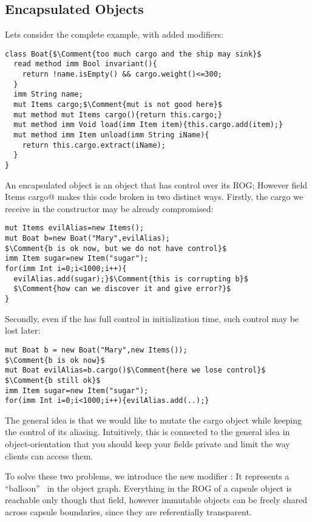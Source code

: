 \saveSpace
\subsection{Encapsulated Objects}
\label{s:encapsulated}
\saveSpace
Lets consider the
complete \Q@Boat@ example, with added modifiers:
\begin{lstlisting}
class Boat{$\Comment{too much cargo and the ship may sink}$
  read method imm Bool invariant(){
    return !name.isEmpty() && cargo.weight()<=300;
  }
  imm String name;
  mut Items cargo;$\Comment{mut is not good here}$
  mut method mut Items cargo(){return this.cargo;}
  mut method imm Void load(imm Item item){this.cargo.add(item);} 
  mut method imm Item unload(imm String iName){
    return this.cargo.extract(iName);
  }
}
\end{lstlisting}
An encapsulated object is an object
 that has control over its ROG;
However field \Q@mut Items cargo@ makes this code
broken in two distinct ways. Firstly, the cargo we receive in the constructor may
be already compromised:
\saveSpace
\begin{lstlisting}
mut Items evilAlias=new Items();
mut Boat b=new Boat("Mary",evilAlias);
$\Comment{b is ok now, but we do not have control}$
imm Item sugar=new Item("sugar");
for(imm Int i=0;i<1000;i++){
  evilAlias.add(sugar);}$\Comment{this is corrupting b}$
  $\Comment{how can we discover it and give error?}$
}
\end{lstlisting}
\saveSpace 
Secondly, even if the \Q@Boat@ has full control 
in initialization time, such control may be lost later:
\saveSpace
\begin{lstlisting}
mut Boat b = new Boat("Mary",new Items());
$\Comment{b is ok now}$
mut Boat evilAlias=b.cargo()$\Comment{here we lose control}$
$\Comment{b still ok}$
imm Item sugar=new Item("sugar");
for(imm Int i=0;i<1000;i++){evilAlias.add(..);}
\end{lstlisting}
\saveSpace
The general idea is that we would like to mutate the cargo object while keeping the control of its aliasing.
Intuitively, this is connected to the general idea in object-orientation that you should keep your fields private and limit the way clients can access them.

To solve these two problems, we introduce the new modifier \Q@capsule@:
It represents a ``balloon''~\cite{Almeida97,ServettoEtAl13a} in the object graph.
Everything in the ROG of a capsule object is reachable only though that field, however
immutable objects can be freely shared across capsule boundaries, since they are referentially transparent.

